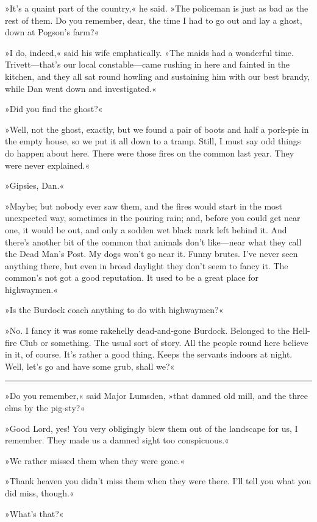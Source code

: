 »It's a quaint part of the country,« he said. »The policeman is just as bad as the rest of them. Do you remember, dear, the time I had to go out and lay a ghost, down at Pogson's farm?«

»I do, indeed,« said his wife emphatically. »The maids had a wonderful time. Trivett—that's our local constable—came rushing in here and fainted in the kitchen, and they all sat round howling and sustaining him with our best brandy, while Dan went down and investigated.«

»Did you find the ghost?«

»Well, not the ghost, exactly, but we found a pair of boots and half a pork-pie in the empty house, so we put it all down to a tramp. Still, I must say odd things do happen about here. There were those fires on the common last year. They were never explained.«

»Gipsies, Dan.«

»Maybe; but nobody ever saw them, and the fires would start in the most unexpected way, sometimes in the pouring rain; and, before you could get near one, it would be out, and only a sodden wet black mark left behind it. And there's another bit of the common that animals don't like—near what they call the Dead Man's Post. My dogs won't go near it. Funny brutes. I've never seen anything there, but even in broad daylight they don't seem to fancy it. The common's not got a good reputation. It used to be a great place for highwaymen.«

»Is the Burdock coach anything to do with highwaymen?«

»No. I fancy it was some rakehelly dead-and-gone Burdock. Belonged to the Hell-fire Club or something. The usual sort of story. All the people round here believe in it, of course. It's rather a good thing. Keeps the servants indoors at night. Well, let's go and have some grub, shall we?«

\noindent\hfil\rule{0.5\textwidth}{.4pt}\hfil 

»Do you remember,« said Major Lumsden, »that damned old mill, and the three elms by the pig-sty?«

»Good Lord, yes! You very obligingly blew them out of the landscape for us, I remember. They made us a damned sight too conspicuous.«

»We rather missed them when they were gone.«

»Thank heaven you didn't miss them when they were there. I'll tell you what you did miss, though.«

»What's that?«

